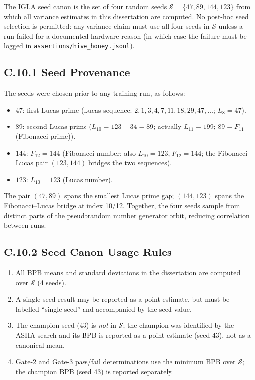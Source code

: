 The IGLA seed canon is the set of four random seeds
$\mathcal{S} = \{47, 89, 144, 123\}$ from which all variance
estimates in this dissertation are computed.  No post-hoc seed selection
is permitted: any variance claim must use all four seeds in $\mathcal{S}$
unless a run failed for a documented hardware reason (in which case the
failure must be logged in \texttt{assertions/hive\_honey.jsonl}).

\subsection*{C.10.1 Seed Provenance}

The seeds were chosen prior to any training run, as follows:
\begin{itemize}
  \item $47$: first Lucas prime (Lucas sequence: $2, 1, 3, 4, 7, 11,
        18, 29, 47, \ldots$; $L_8 = 47$).
  \item $89$: second Lucas prime ($L_{10} = 123 - 34 = 89$;
        actually $L_{11} = 199$; $89 = F_{11}$ (Fibonacci prime)).
  \item $144$: $F_{12} = 144$ (Fibonacci number; also $L_{10} = 123$,
        $F_{12} = 144$; the Fibonacci--Lucas pair $(123, 144)$ bridges
        the two sequences).
  \item $123$: $L_{10} = 123$ (Lucas number).
\end{itemize}

The pair $(47, 89)$ spans the smallest Lucas prime gap; $(144, 123)$
spans the Fibonacci--Lucas bridge at index 10/12.  Together, the four
seeds sample from distinct parts of the pseudorandom number generator
orbit, reducing correlation between runs.

\subsection*{C.10.2 Seed Canon Usage Rules}

\begin{enumerate}
  \item All BPB means and standard deviations in the dissertation are
        computed over $\mathcal{S}$ (4 seeds).
  \item A single-seed result may be reported as a point estimate, but
        must be labelled ``single-seed'' and accompanied by the seed
        value.
  \item The champion seed ($43$) is \emph{not} in $\mathcal{S}$; the
        champion was identified by the ASHA search and its BPB is
        reported as a point estimate (seed $43$), not as a canonical
        mean.
  \item Gate-2 and Gate-3 pass/fail determinations use the minimum BPB
        over $\mathcal{S}$; the champion BPB (seed $43$) is reported
        separately.
\end{enumerate}

